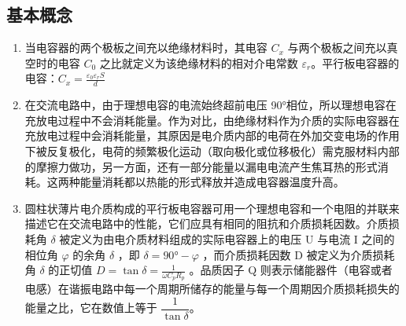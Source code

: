 \documentclass[a4paper,utf8]{article}
\begin{document}
    \subsection{基本概念}
        \begin{enumerate}
            \item 当电容器的两个极板之间充以绝缘材料时，其电容 $C_x$ 与两个极板之间充以真空时的电容 $C_0$ 之比就定义为该绝缘材料的相对介电常数 $\varepsilon_r$。平行板电容器的电容：$C_x=\frac{\varepsilon_0 \varepsilon_r S}{d}$
            \item 在交流电路中，由于理想电容的电流始终超前电压 90°相位，所以理想电容在充放电过程中不会消耗能量。作为对比，由绝缘材料作为介质的实际电容器在充放电过程中会消耗能量，其原因是电介质内部的电荷在外加交变电场的作用下被反复极化，电荷的频繁极化运动（取向极化或位移极化）需克服材料内部的摩擦力做功，另一方面，还有一部分能量以漏电电流产生焦耳热的形式消耗。这两种能量消耗都以热能的形式释放并造成电容器温度升高。
            \item 圆柱状薄片电介质构成的平行板电容器可用一个理想电容和一个电阻的并联来描述它在交流电路中的性能，它们应具有相同的阻抗和介质损耗因数。介质损耗角 $\delta$ 被定义为由电介质材料组成的实际电容器上的电压 U 与电流 I 之间的相位角 $\varphi$ 的余角 $\delta$ ，即 $\delta  = 90\si{\degree} - \varphi$ ，而介质损耗因数 D 被定义为介质损耗角 $\delta$ 的正切值 $D=\tan\delta=\frac{1}{\omega C_{p}R_{p}}$ 。品质因子 Q 则表示储能器件（电容或者电感）在谐振电路中每一个周期所储存的能量与每一个周期因介质损耗损失的能量之比，它在数值上等于 $\dfrac{1}{\tan\delta}$。
        \end{enumerate}
        
\end{document}
